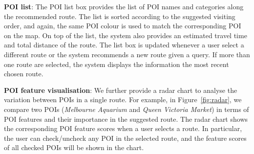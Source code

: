 
\textbf{POI list}:
The POI list box provides the list of POI names and categories along the recommended route.
The list is sorted according to the suggested visiting order, and again, the same POI colour is used to match the corresponding POI on the map.
On top of the list, the system also provides an estimated travel time and total distance of the route. 
The list box is updated whenever a user select a different route or the system recommends a new route given a query.
If more than one route are selected, the system displays the information the most recent chosen route.

\textbf{POI feature visualisation}: We further provide a radar chart to analyse the variation between POIs in a single route. 
For example, in Figure~\ref{fig:radar}, we compare two POIs (\textit{Melbourne Aquarium} and \textit{Queen Victoria Market}) in terms of POI features and their importance in the suggested route. 
The radar chart shows the corresponding POI feature scores when a user selects a route.
In particular, the user can check/uncheck any POI in the selected route, and the feature scores of all checked POIs will be shown in the chart.

